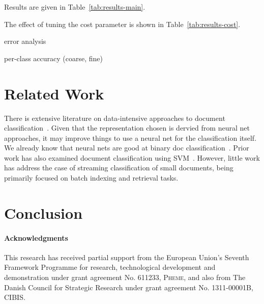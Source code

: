 \documentclass[10pt,a4paper]{article}
\begin{document}
Results are given in Table~\ref{tab:results-main}.

The effect of tuning the cost parameter is shown in Table~\ref{tab:results-cost}.

error analysis

per-class accuracy (coarse, fine)


\section{Related Work}

There is extensive literature on data-intensive approaches to document classification~\cite{sebastiani2002machine}.
Given that the representation chosen is dervied from neural net approaches, it may improve things to use a neural net for the classification itself.
We already know that neural nets are good at binary doc classification~\cite{derczynski2006machine}.
Prior work has also examined document classification using SVM~\cite{isa2008text}.
However, little work has address the case of streaming classification of small documents, being primarily focused on batch indexing and retrieval tasks.


\section{Conclusion}


\paragraph*{Acknowledgments}
This research has received partial support from the European Union’s Seventh Framework Programme for research, technological development and demonstration under grant agreement No. 611233, \textsc{Pheme}, and also from The Danish Council for Strategic Research under grant agreement No. 1311-00001B, \textsc{CIBIS}.

\balance



\end{document}
